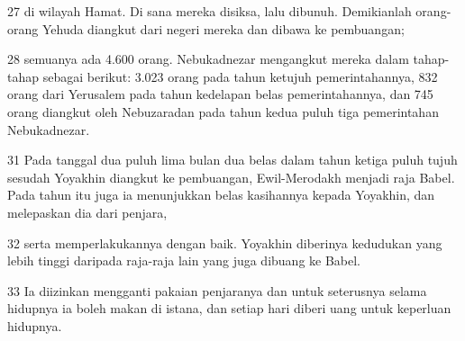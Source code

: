 \par 27 di wilayah Hamat. Di sana mereka disiksa, lalu dibunuh. Demikianlah orang-orang Yehuda diangkut dari negeri mereka dan dibawa ke pembuangan;
\par 28 semuanya ada 4.600 orang. Nebukadnezar mengangkut mereka dalam tahap-tahap sebagai berikut: 3.023 orang pada tahun ketujuh pemerintahannya, 832 orang dari Yerusalem pada tahun kedelapan belas pemerintahannya, dan 745 orang diangkut oleh Nebuzaradan pada tahun kedua puluh tiga pemerintahan Nebukadnezar.
\par 31 Pada tanggal dua puluh lima bulan dua belas dalam tahun ketiga puluh tujuh sesudah Yoyakhin diangkut ke pembuangan, Ewil-Merodakh menjadi raja Babel. Pada tahun itu juga ia menunjukkan belas kasihannya kepada Yoyakhin, dan melepaskan dia dari penjara,
\par 32 serta memperlakukannya dengan baik. Yoyakhin diberinya kedudukan yang lebih tinggi daripada raja-raja lain yang juga dibuang ke Babel.
\par 33 Ia diizinkan mengganti pakaian penjaranya dan untuk seterusnya selama hidupnya ia boleh makan di istana, dan setiap hari diberi uang untuk keperluan hidupnya.


